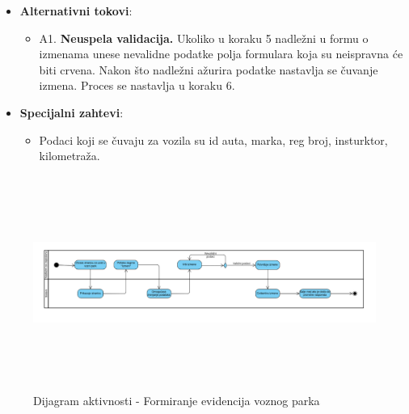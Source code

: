 \begin{itemize}
  \item \textbf{Alternativni tokovi}:
      \begin{itemize}
        \item A1. \textbf{Neuspela validacija.}
        Ukoliko u koraku 5 nadležni u formu o izmenama unese nevalidne podatke polja formulara koja su neispravna će biti crvena.
        Nakon što nadležni ažurira podatke nastavlja se čuvanje izmena. Proces se nastavlja u koraku 6.
      \end{itemize}
      
  \item \textbf{Specijalni zahtevi}:
      \begin{itemize}
        \item Podaci koji se čuvaju za vozila su id auta, marka, reg broj, insturktor, kilometraža. 
      \end{itemize}
\end{itemize}

\begin{figure}[H]
  \begin{center}
      \includegraphics[width=170mm, height=70mm]{Diagrams/evidencija_vozila.png}
  \end{center}
  \caption {Dijagram aktivnosti - Formiranje evidencija voznog parka}
  \label{activity_evidencija_vozila}

\end{figure}
